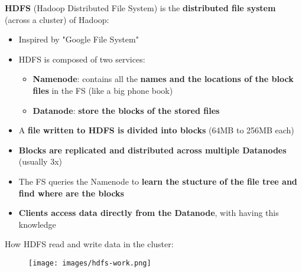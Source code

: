 \documentclass{beamer}[10pt, usepdftitle=false handout]
\begin{document}
	\begin{frame}
	
	\textbf{HDFS} (Hadoop Distributed File System) is the \textbf{distributed file system} (across a cluster) of Hadoop:
	\vspace{0.6em}
	
	\begin{itemize}
		\item{Inspired by "Google File System"}	
		\item{HDFS is composed of two services:
			\begin{itemize}
			\item{\textbf{Namenode}: contains all the \textbf{names and the locations of the block files} in the FS (like a big phone book)}
			\item{\textbf{Datanode}: \textbf{store the blocks of the stored files}}
			\end{itemize}}
		\item{A \textbf{file written to HDFS is divided into blocks} (64MB to 256MB each)}
		\item{\textbf{Blocks are replicated and distributed across multiple Datanodes} (usually 3x)}
		\item{The FS queries the Namenode to \textbf{learn the stucture of the file tree and find where are the blocks}}
		\item{\textbf{Clients access data directly from the Datanode}, with having this knowledge}	
	\end{itemize}
	
	
	\end{frame}
	
	\begin{frame}
	
	How HDFS read and write data in the cluster:
	\vspace*{0.6em}

	\begin{figure}
	\texttt{[image: images/hdfs-work.png]} 
	\end{figure}	
	
	
	\end{frame}
	
\end{document}
